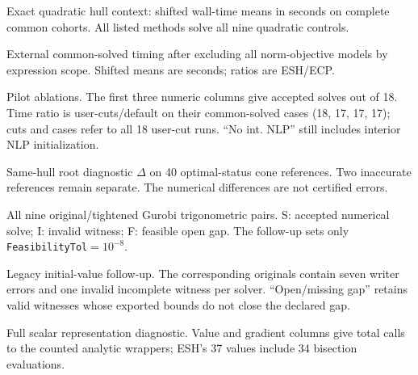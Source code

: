 \begin{table}[htbp]\centering\small
\caption{Exact quadratic hull context: shifted wall-time means in seconds on complete common cohorts. All listed methods solve all nine quadratic controls.}\label{tab:quadratic}

\end{table}
\begin{table}[htbp]\centering\small
\caption{External common-solved timing after excluding all norm-objective models by expression scope. Shifted means are seconds; ratios are ESH/ECP.}\label{tab:legacy-pairs}

\end{table}
\begin{table}[htbp]\centering\scriptsize
\caption{Pilot ablations. The first three numeric columns give accepted solves out of 18. Time ratio is user-cuts/default on their common-solved cases (18, 17, 17, 17); cuts and cases refer to all 18 user-cut runs. ``No int. NLP'' still includes interior NLP initialization.}\label{tab:ablations}

\end{table}
\begin{table}[htbp]\centering\small
\caption{Same-hull root diagnostic $\Delta$ on 40 optimal-status cone references. Two inaccurate references remain separate. The numerical differences are not certified errors.}\label{tab:roots}

\end{table}
\begin{table}[htbp]\centering\small
\caption{All nine original/tightened Gurobi trigonometric pairs. S: accepted numerical solve; I: invalid witness; F: feasible open gap. The follow-up sets only \texttt{FeasibilityTol}$=10^{-8}$.}\label{tab:trig-followup}

\end{table}
\begin{table}[htbp]\centering\small
\caption{Legacy initial-value follow-up. The corresponding originals contain seven writer errors and one invalid incomplete witness per solver. ``Open/missing gap'' retains valid witnesses whose exported bounds do not close the declared gap.}\label{tab:initialization}

\end{table}
\begin{table}[htbp]\centering\small
\caption{Full scalar representation diagnostic. Value and gradient columns give total calls to the counted analytic wrappers; ESH's 37 values include 34 bisection evaluations.}\label{tab:oracle}

\end{table}
\clearpage
